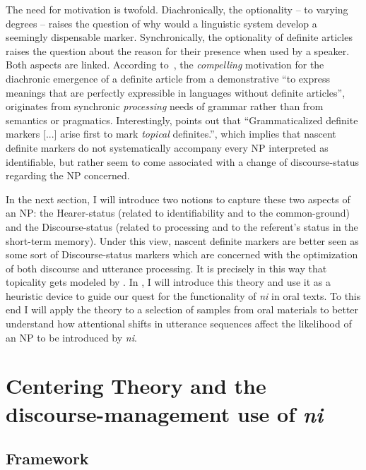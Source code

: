 \documentclass[output=paper
,modfonts
,nonflat]{langsci/langscibook}
\begin{document}
The need for motivation is twofold. Diachronically, the optionality -- to varying degrees -- raises the question of why would a linguistic system develop a seemingly dispensable marker. Synchronically, the optionality of definite articles raises the question about the reason for their presence when used by a speaker. Both aspects are linked. According to~\citet[84]{Hawkins2004}, the \textit{compelling} motivation for the diachronic emergence of a definite article from a demonstrative ``to express meanings that are perfectly expressible in languages without definite articles'', originates from synchronic \textit{processing} needs of grammar rather than from semantics or pragmatics. Interestingly, \citet[474]{Givon2001} points out that ``Grammaticalized definite markers [...] arise first to mark \textit{topical} definites.'', which implies that nascent definite markers do not systematically accompany every NP interpreted as identifiable, but rather seem to come associated with a change of discourse-status regarding the NP concerned. 

In the next section, I will introduce two notions to capture these two aspects of an NP: the Hearer-status (related to identifiability and to the common-ground) and the Discourse-status (related to processing and to the referent's status in the short-term memory). Under this view, nascent definite markers are better seen as some sort of Discourse-status markers which are concerned with the optimization of both discourse and utterance processing. It is precisely in this way that topicality gets modeled by . In , I will introduce this theory and use it as a heuristic device to guide our quest for the functionality of \textit{ni} in oral texts. To this end I will apply the theory to a selection of samples from oral materials to better understand how attentional shifts in utterance sequences \largerpage affect the likelihood of an NP to be introduced by \textit{ni}.

\section{Centering Theory and the discourse-management use of \textit{ni}}\label{sec:pico:3} 

\subsection{Framework}\label{sec:pico:3.1} 
\end{document}
